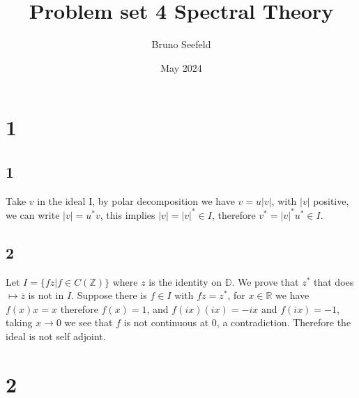 \documentclass{article}
\title{Problem set 4 Spectral Theory}
\author{Bruno Seefeld}
\date{May 2024}
\begin{document}
\maketitle





\section{1}
\subsection*{1}
Take $v$ in the ideal I, by polar decomposition we have $v=u|v|$, with $|v|$ positive, we can write $|v|=u^* v$, this implies $|v|=|v|^\ast \in I$, therefore 
$v^\ast=|v|^\ast u^*\in I$.

\subsection*{2}

Let $I=\{fz|f\in C(\mathbb{Z})\}$ where $z$ is the identity on $\mathbb{D}$. We prove that $z^\ast$ that does $\mapsto \overline{z}$ is not in $I$. Suppose 
there is $f\in I$ with $fz=z^\ast$, for $x\in \mathbb{R}$ we have $f(x)x=x$ therefore $f(x)=1$, and $f(ix)(ix)=-ix$ and $f(ix)=-1$, taking $x\to 0$ we see that $f$ is 
not continuous at $0$, a contradiction. Therefore the ideal is not self adjoint.  



\section{2}
\end{document}
